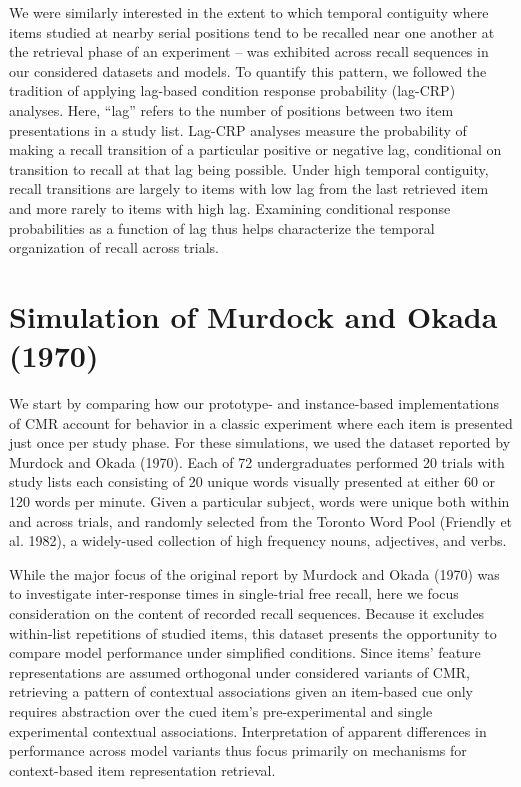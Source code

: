 \documentclass[
  letterpaper,
  DIV=11]{article}
\begin{document}
We were similarly interested in the extent to which temporal contiguity
where items studied at nearby serial positions tend to be recalled near
one another at the retrieval phase of an experiment -- was exhibited
across recall sequences in our considered datasets and models. To
quantify this pattern, we followed the tradition of applying lag-based
condition response probability (lag-CRP) analyses. Here, ``lag'' refers
to the number of positions between two item presentations in a study
list. Lag-CRP analyses measure the probability of making a recall
transition of a particular positive or negative lag, conditional on
transition to recall at that lag being possible. Under high temporal
contiguity, recall transitions are largely to items with low lag from
the last retrieved item and more rarely to items with high lag.
Examining conditional response probabilities as a function of lag thus
helps characterize the temporal organization of recall across trials.

\hypertarget{simulation-of-murdock-and-okada-1970}{%
\section{Simulation of Murdock and Okada
(1970)}\label{simulation-of-murdock-and-okada-1970}}

We start by comparing how our prototype- and instance-based
implementations of CMR account for behavior in a classic experiment
where each item is presented just once per study phase. For these
simulations, we used the dataset reported by Murdock and Okada (1970).
Each of 72 undergraduates performed 20 trials with study lists each
consisting of 20 unique words visually presented at either 60 or 120
words per minute. Given a particular subject, words were unique both
within and across trials, and randomly selected from the Toronto Word
Pool (Friendly et al. 1982), a widely-used collection of high frequency
nouns, adjectives, and verbs.

While the major focus of the original report by Murdock and Okada (1970)
was to investigate inter-response times in single-trial free recall,
here we focus consideration on the content of recorded recall sequences.
Because it excludes within-list repetitions of studied items, this
dataset presents the opportunity to compare model performance under
simplified conditions. Since items' feature representations are assumed
orthogonal under considered variants of CMR, retrieving a pattern of
contextual associations given an item-based cue only requires
abstraction over the cued item's pre-experimental and single
experimental contextual associations. Interpretation of apparent
differences in performance across model variants thus focus primarily on
mechanisms for context-based item representation retrieval.
\end{document}
